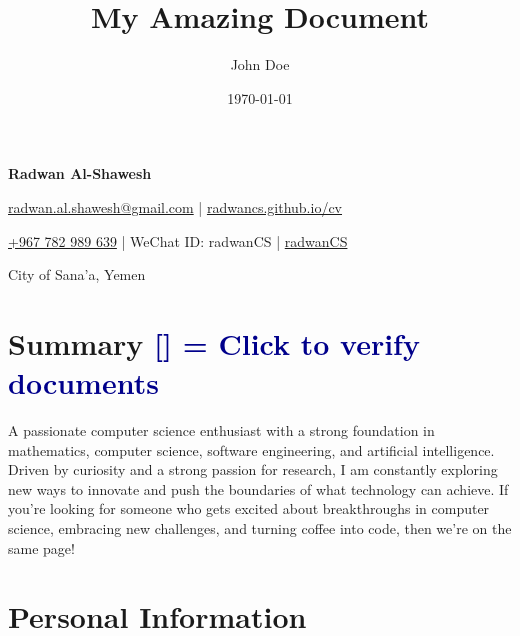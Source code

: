 \documentclass[a4paper,11pt]{article}
\title{My Amazing Document}
\author{John Doe}
\date{\today}  %
\newcommand{\socialicon}[1]{\raisebox{-0.05em}{\resizebox{!}{1em}{#1}}}
\newcommand{\headerfontiii}{\fontfamily{ppl}\selectfont} %
\begin{document}
	\headerfontiii
	
	\begin{center}
		{\Huge\textbf{Radwan Al-Shawesh}}
	\end{center}
	\vspace{-6mm}
	
	\begin{center}
		\small{
			\href{mailto:radwan.al.shawesh@gmail.com}{radwan.al.shawesh@gmail.com} | 
			\href{https://radwancs.github.io/cv/}{radwancs.github.io/cv}
		}
	\end{center}
	\vspace{-6mm}
	
	\begin{center}
		\small{
			\socialicon{\faWhatsappSquare} \href{https://wa.me/967782989639}{+967 782 989 639} |
			\socialicon{\faWeixin} WeChat ID: radwanCS |
			\socialicon{\faGithub} \href{https://github.com/radwanCS}{radwanCS}
		}
	\end{center}
	\vspace{-6mm}
	
	\begin{center}
		\small{City of Sana'a, Yemen}
	\end{center}
	\vspace{-4mm}

	\section{\texorpdfstring{\textbf{Summary} \hspace*{\fill} 
    \textcolor{darkblue}{\scriptsize [\href{https://1drv.ms/f/c/0b66680558f854cf/EmMcNN-2rp5JkBqREvrLziABZw0qcxK9gYBRxxkRwz2g9A?e=Dd3Xgb}{\faGlobe}] = Click to verify documents}}{Summary}}

	\vspace{1mm}
	\small{
		A passionate computer science enthusiast with a strong foundation in mathematics, computer science, software engineering, and 
		artificial intelligence. Driven by curiosity and a strong passion for research, I am constantly exploring new ways to innovate 
		and push the boundaries of what technology can achieve. If you're looking for someone who gets excited about breakthroughs in computer science, 
		embracing new challenges, and turning coffee into code, then we’re on the same page!
	}
	\vspace{-2mm}
	
	\section{\textbf{Personal Information}}
	\vspace{2mm}
	
\end{document}
